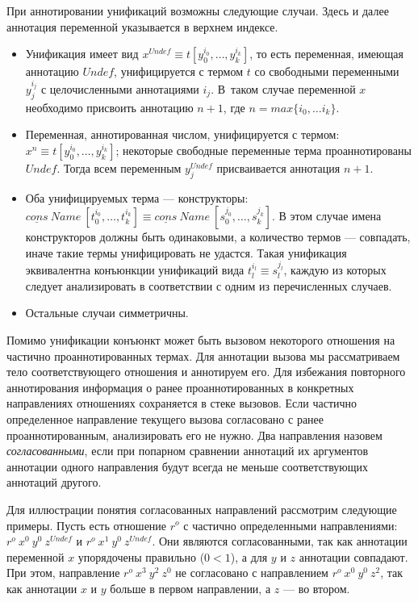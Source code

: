 \documentclass[conference,a4paper,american,russian]{IEEEtran}
\begin{document}
При аннотировании унификаций возможны следующие случаи. 
Здесь и далее аннотация переменной указывается в верхнем индексе.
\begin{itemize}
    \item Унификация имеет вид $x^{Undef} \equiv t[y_0^{i_0}, \dots, y_k^{i_k}]$, то есть переменная, имеющая аннотацию $Undef$, унифицируется с термом $t$ со свободными переменными $y_j^{i_j}$ с целочисленными аннотациями $i_j$. В~таком случае переменной $x$ необходимо присвоить аннотацию $n + 1$, где $n = max \{ i_0, \dots i_k\}$.
    \item Переменная, аннотированная числом, унифицируется с термом: $x^{n} \equiv t[y_0^{i_0}, \dots, y_k^{i_k}]$; некоторые свободные переменные терма проаннотированы $Undef$.
    Тогда всем переменным $y_j^{Undef}$ присваивается аннотация $n+1$.
    \item Оба унифицируемых терма --- конструкторы: $\underline{cons} \ Name \ [t_0^{i_0}, \dots, t_k^{i_k}] \equiv \underline{cons} \ Name \ [s_0^{j_0}, \dots, s_k^{j_k}]$.
    В этом случае имена конструкторов должны быть одинаковыми, а количество термов --- совпадать, иначе такие термы унифицировать не удастся.
    Такая унификация эквивалентна конъюнкции унификаций вида $t_l^{i_l} \equiv s_l^{j_l}$, каждую из которых следует анализировать в соответствии с одним из перечисленных случаев.  
    \item Остальные случаи симметричны.
\end{itemize}

Помимо унификации конъюнкт может быть вызовом некоторого отношения на частично проаннотированных термах. 
Для аннотации вызова мы рассматриваем тело соответствующего отношения и аннотируем его. 
Для избежания повторного аннотирования информация о ранее проаннотированных в конкретных направлениях отношениях сохраняется в стеке вызовов.
Если частично определенное направление текущего вызова согласовано с ранее проаннотированным, анализировать его не нужно.  
Два направления назовем \emph{согласованными}, если при попарном сравнении аннотаций их аргументов аннотации одного направления будут всегда не меньше соответствующих аннотаций другого.

Для иллюстрации понятия согласованных направлений рассмотрим следующие примеры. 
Пусть есть отношение $r^o$ с частично определенными направлениями: $r^o \ x^0 \ y^0 \ z^{Undef}$ и $r^o \ x^1 \ y^0 \ z^{Undef}$.
Они являются согласованными, так как аннотации переменной $x$ упорядочены правильно ($0 < 1$), а для $y$ и $z$ аннотации совпадают.
При этом, направление $r^o \ x^3 \ y^2 \ z^0$ не согласовано с направлением $r^o \ x^0 \ y^0 \ z^2$, так как аннотации $x$ и $y$ больше в первом направлении, а  $z$ --- во втором.
\end{document}
